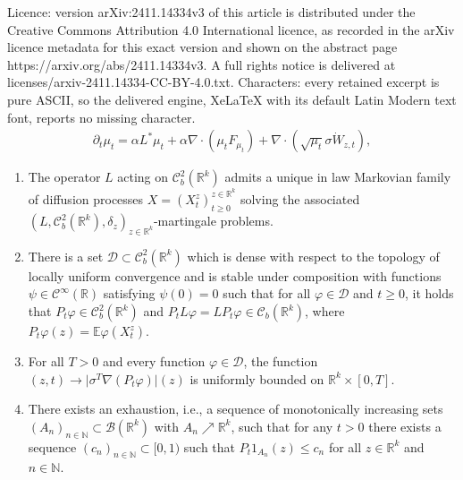 \documentclass[10pt,a4paper]{amsart}
\newcommand{\C}{\mathcal C}
\newcommand{\E}{\mathbb{E}}
\newcommand{\F}{F}
\newcommand{\N}{\mathbb{N}}
\newcommand{\R}{\mathbb{R}}
\begin{document}
Licence: version arXiv:2411.14334v3 of this article is distributed under the Creative Commons Attribution 4.0 International licence, as recorded in the arXiv licence metadata for this exact version and shown on the abstract page https://arxiv.org/abs/2411.14334v3. A full rights notice is delivered at licenses/arxiv-2411.14334-CC-BY-4.0.txt. Characters: every retained excerpt is pure ASCII, so the delivered engine, XeLaTeX with its default Latin Modern text font, reports no missing character.
\begin{align}
    \partial_t \mu_t = \alpha L^* \mu_t + \alpha \nabla \cdot(\mu_t \F
    _{\mu_t}) +  \nabla \cdot(\sqrt{\mu_t} \sigma \dot{W}_{z,t}), \label{eqn:DKE1}
\end{align}

  \begin{enumerate}[label=(L.{\arabic*})]
  \item \label{assL:martp}
    The operator $L$ acting on $\C_b^2(\R^k)$ admits a unique in law Markovian family of diffusion processes
    $X=(X_t^z)_{t \geq 0}^{z\in \R^k}$ solving the associated
    $(L,\C_b^2(\R^k), \delta_z)_{z \in \R^k}$-martingale problems.
       
  \item \label{assL:chainr} There is a set $\mathcal D\subset \C^2_b(\R^k) $ which is dense with respect to
    the topology of locally uniform convergence and is stable under composition with functions
    $\psi \in \C^\infty(\R)$ satisfying $\psi(0) = 0$ such that for all $\varphi \in \mathcal D$ and
    $t \geq 0$, it holds that $P_t \varphi \in \C^2_b(\R^k)$ and $P_t L\varphi = LP_t \varphi \in \C_b(\R^k)$,
    where $P_t \varphi(z) = \E \varphi(X_t^z)$.
  \item \label{assL:gradbound} For all $T>0$ and every function $\varphi \in \mathcal D$, the function
    $(z,t) \to \bigl|\sigma^T\nabla (P_t \varphi)\bigr|(z)$ is uniformly bounded on $\R^k\times [0,T]$.
  \item \label{assL:exhaust} There exists an exhaustion, i.e., a sequence of monotonically increasing sets $(A_n)_{n \in \N} \subset \mathcal{B}(\R^k)$ with
    $A_n \nearrow \R^k$, such that for any $t >0$ there exists a sequence $(c_n)_{n \in \N} \subset [0, 1)$
    such that $P_t 1_{A_n}(z) \leq c_n$ for all $z \in \R^k$ and $n \in \N$.
  \end{enumerate}
\end{document}
